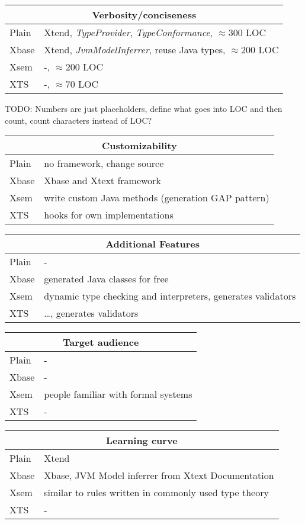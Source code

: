 \begin{frame}
\framebreak
\begin{tabularx}{\linewidth}{ l   X }
\multicolumn{2}{c}{Verbosity/conciseness} \\ \hline
Plain & Xtend, \emph{TypeProvider}, \emph{TypeConformance}, $\approx$300 LOC\\
Xbase & Xtend, \emph{JvmModelInferrer}, reuse Java types, $\approx$200 LOC  \\
Xsem &  -, $\approx$200 LOC \\
XTS & -, $\approx$70 LOC\\
\end{tabularx}

TODO: Numbers are just placeholders, define what goes into LOC and then count,
count characters instead of LOC?

\framebreak
\begin{tabularx}{\linewidth}{ l   X }
\multicolumn{2}{c}{Customizability} \\ \hline
Plain & no framework, change source \\
Xbase & Xbase and Xtext framework \\
Xsem & write custom Java methods (generation GAP
pattern)
\\
XTS & hooks for own implementations \\
\end{tabularx}

\framebreak
\begin{tabularx}{\linewidth}{ l   X }
\multicolumn{2}{c}{Additional Features} \\ \hline
Plain & - \\
Xbase & generated Java classes for free \\
Xsem & dynamic type checking and interpreters, generates validators \\
XTS & \ldots, generates validators \\
\end{tabularx}

\framebreak
\begin{tabularx}{\linewidth}{ l   X }
\multicolumn{2}{c}{Target audience} \\ \hline
Plain & - \\
Xbase & - \\
Xsem & people familiar with formal systems \\
XTS & - \\
\end{tabularx}

\framebreak
\begin{tabularx}{\linewidth}{ l   X }
\multicolumn{2}{c}{Learning curve} \\ \hline
Plain & Xtend \\
Xbase & Xbase, JVM Model inferrer from Xtext Documentation \\
Xsem & similar to rules written in commonly used type theory \\
XTS & - \\
\end{tabularx}


\end{frame}
